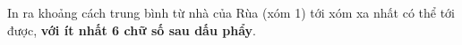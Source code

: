 In ra khoảng cách trung bình từ nhà của Rùa (xóm 1) tới xóm xa nhất có thể tới được, \textbf{với ít nhất 6 chữ số sau dấu phẩy}.